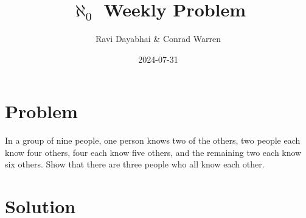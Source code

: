 \documentclass{article}
\title{$\aleph_{0}$ Weekly Problem}
\author{Ravi Dayabhai \& Conrad Warren}
\date{2024-07-31}
\numberwithin{subcase}{case}
\begin{document}
\maketitle

\section*{Problem}

In a group of nine people, one person knows two of the others, two people each know four others, four each know five others, and the remaining two each know six others. Show that there are three people who all know each other.

\section*{Solution}
\end{document}
